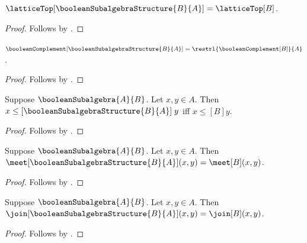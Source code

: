 \begin{proposition}\label{boolean_subalgebra_structure_top}
    $\latticeTop[\booleanSubalgebraStructure{B}{A}]
        =\latticeTop[B]$.
\end{proposition}
\begin{proof}
    Follows by
        .
\end{proof}

\begin{proposition}\label{boolean_subalgebra_structure_complement}
    $\booleanComplement[\booleanSubalgebraStructure{B}{A}]
        =\restrl{\booleanComplement[B]}{A}$.
\end{proposition}
\begin{proof}
    Follows by
        .
\end{proof}

\begin{proposition}\label{boolean_subalgebra_structure_order_iff}
    Suppose $\booleanSubalgebra{A}{B}$.
    Let $x,y\in A$.
    Then $x\mathrel{\leq[\booleanSubalgebraStructure{B}{A}]}y$ iff
        $x\mathrel{\leq[B]}y$.
\end{proposition}
\begin{proof}
    Follows by
        .
\end{proof}

\begin{proposition}\label{boolean_subalgebra_structure_meet_apply}
    Suppose $\booleanSubalgebra{A}{B}$.
    Let $x,y\in A$.
    Then $\meet[\booleanSubalgebraStructure{B}{A}](x,y)
        =\meet[B](x,y)$.
\end{proposition}
\begin{proof}
    Follows by
        .
\end{proof}

\begin{proposition}\label{boolean_subalgebra_structure_join_apply}
    Suppose $\booleanSubalgebra{A}{B}$.
    Let $x,y\in A$.
    Then $\join[\booleanSubalgebraStructure{B}{A}](x,y)
        =\join[B](x,y)$.
\end{proposition}
\begin{proof}
    Follows by
        .
\end{proof}

